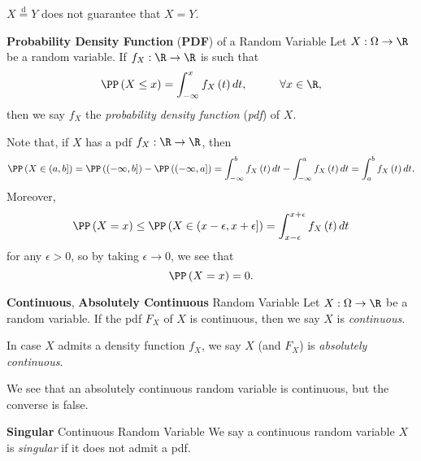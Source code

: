 \documentclass[stat901]{subfiles}
\begin{document}
    \np $X\overset{\text{d}}{=}Y$ does not guarantee that $X=Y$.

    \begin{definition}{\textbf{Probability Density Function} (\textbf{PDF}) of a Random Variable}
        Let $X:\Omega\to\R$ be a random variable. If $f_X:\R\to\R$ is such that
        \begin{equation*}
            \PP\left( X\leq x \right) = \int^{x}_{-\infty}f_X\left( t \right) dt,\hspace{1cm}\forall x\in\R,
        \end{equation*}
        then we say $f_X$ the \emph{probability density function} (\emph{pdf}) of $X$.
    \end{definition}

    \np Note that, if $X$ has a pdf $f_X:\R\to\R$, then
    \begin{equation*}
        \PP\left( X\in\left( a,b \right] \right) = \PP\left( \left( -\infty,b \right] \right)-\PP\left( \left( -\infty,a \right] \right) = \int^{b}_{-\infty}f_X\left( t \right)dt - \int^{a}_{-\infty}f_X\left( t \right)dt = \int^{b}_{a}f_X\left( t \right)dt.
    \end{equation*}
    Moreover,
    \begin{equation*}
        \PP\left( X=x \right) \leq \PP\left( X\in\left( x-\epsilon,x+\epsilon \right] \right) = \int^{x+\epsilon}_{x-\epsilon} f_X\left( t \right)dt
    \end{equation*}
    for any $\epsilon>0$, so by taking $\epsilon\to 0$, we see that
    \begin{equation*}
        \PP\left( X=x \right) = 0.
    \end{equation*}

    \begin{definition}{\textbf{Continuous}, \textbf{Absolutely Continuous} Random Variable}
        Let $X:\Omega\to\R$ be a random variable. If the pdf $F_X$ of $X$ is continuous, then we say $X$ is \emph{continuous}.

        In case $X$ admits a density function $f_X$, we say $X$ (and $F_X$) is \emph{absolutely continuous}.
    \end{definition}

    \np We see that an absolutely continuous random variable is continuous, but the converse is false. 

    \begin{definition}{\textbf{Singular} Continuous Random Variable}
        We say a continuous random variable $X$ is \emph{singular} if it does not admit a pdf.
    \end{definition}
\end{document}
